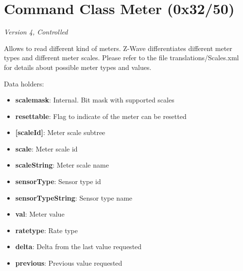 \section{Command Class Meter (0x32/50)}

\textit{Version 4, Controlled}
\newline

Allows to read different kind of meters. Z-Wave differentiates different meter types and different meter scales. Please refer to the file translations/Scales.xml for details about possible meter types and values.
\newline

\noindent
Data holders:

\begin{itemize}
\item \textbf{scalemask}: Internal. Bit mask with supported scales
\item \textbf{resettable}: Flag to indicate of the meter can be resetted
\item \textbf{[scaleId]}: Meter scale subtree
\item \qquad\textbf{scale}: Meter scale id
\item \qquad\textbf{scaleString}: Meter scale name
\item \qquad\textbf{sensorType}: Sensor type id
\item \qquad\textbf{sensorTypeString}: Sensor type name
\item \qquad\textbf{val}: Meter value
\item \qquad\textbf{ratetype}: Rate type
\item \qquad\textbf{delta}: Delta from the last value requested
\item \qquad\textbf{previous}: Previous value requested
\end{itemize}

